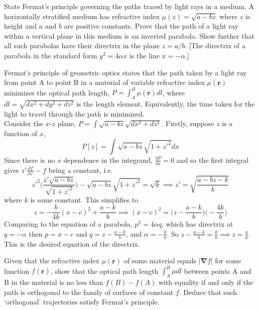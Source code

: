 \documentclass[a4paper]{article}
\begin{document}
\newpage
\begin{qns}[Fermat]
State Fermat's principle governing the paths traced by light rays in a medium. A horizontally stratified medium has refractive index $\mu(z)=\sqrt{a-bz}$ where $z$ is height and $a$ and $b$ are positive constants. Prove that the path of a light ray within a vertical plane in this medium is an inverted parabola. Show further that all such parabolas have their directrix in the plane $z = a/b$. [The directrix of a parabola in the standard form $y^2=4\alpha x$ is the line $x=-\alpha$.]
\end{qns}
\begin{ans}
Fermat's principle of geometric optics states that the path taken by a light ray from point A to point B in a material of variable refractive index $\mu(\mathbf{r})$ minimizes the optical path length, $P=\int_A^B\mu(\mathbf{r})dl$, where $dl=\sqrt{dx^2+dy^2+dz^2}$ is the length element. Equivalently, the time taken for the light to travel through the path is minimized.\\[5pt]
Consider the $x$-$z$ plane, $P=\int\sqrt{a-bz}\sqrt{dx^2+dz^2}$. Firstly, suppose $z$ is a function of $x$,
$$P[z]=\int\sqrt{a-bz}\sqrt{1+z'^2}dx$$
Since there is no $x$ dependence in the integrand, $\frac{\delta P}{\delta x}=0$ and so the first integral gives $z'\frac{\partial f}{\partial z'}-f$ being a constant, i.e.
$$z'^2\bigg(\frac{z'\sqrt{a-bz}}{\sqrt{1+z'^2}}\bigg)-\sqrt{a-bz}\sqrt{1+z'^2}=\sqrt{k}\implies z'=\sqrt{\frac{a-bz-k}{k}}$$
where $k$ is some constant. This simplifies to $$z=-\frac{b}{4k}(x-c)^2+\frac{a-k}{b}\implies (x-c)^2=\bigg(z-\frac{a-k}{b}\bigg)\bigg(-\frac{4k}{b}\bigg)$$ 
Comparing to the equation of a parabola, $p^2=4\alpha q$, which has directrix at $q=-\alpha$ then $p=x-c$ and $q=z-\frac{a-k}{b}$, and $\alpha=-\frac{k}{b}$. So $z-\frac{a-k}{b}=\frac{k}{b}\implies z=\frac{a}{b}$. This is the desired equation of the directrix. 
\end{ans}
\begin{qns}[Fermat]
Given that the refractive index $\mu(\mathbf{r})$ of some material equals $|\boldsymbol{\nabla}f|$ for some function $f(\mathbf{r})$, show that the optical path length $\int_A^B\mu dl$ between points A and B in the material is no less than $f(B)-f(A)$ with equality if and only if the path is orthogonal to the family of surfaces of constant $f$. Deduce that such `orthogonal' trajectories satisfy Fermat's principle.
\end{qns}
\end{document}
